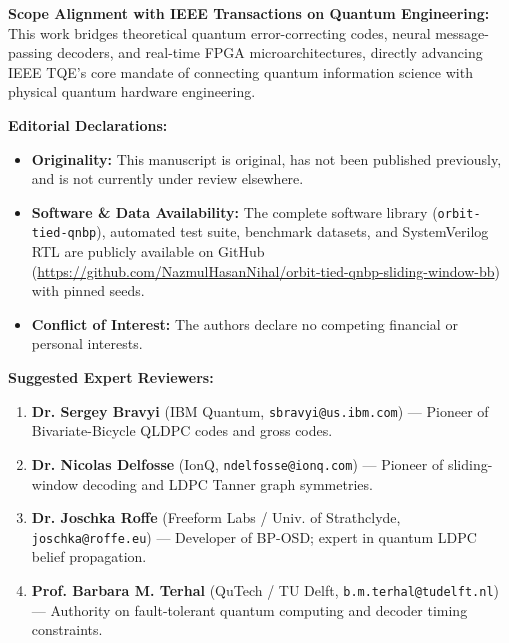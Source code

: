 \documentclass[11pt,a4paper]{article}
\begin{document}
\vspace{0.3cm}

\noindent
\textbf{Scope Alignment with IEEE Transactions on Quantum Engineering:}\\
This work bridges theoretical quantum error-correcting codes, neural message-passing decoders, and real-time FPGA microarchitectures, directly advancing IEEE TQE's core mandate of connecting quantum information science with physical quantum hardware engineering.

\vspace{0.3cm}

\noindent
\textbf{Editorial Declarations:}
\begin{itemize}
    \item \textbf{Originality:} This manuscript is original, has not been published previously, and is not currently under review elsewhere.
    \item \textbf{Software \& Data Availability:} The complete software library (\texttt{orbit-tied-qnbp}), automated test suite, benchmark datasets, and SystemVerilog RTL are publicly available on GitHub (\url{https://github.com/NazmulHasanNihal/orbit-tied-qnbp-sliding-window-bb}) with pinned seeds.
    \item \textbf{Conflict of Interest:} The authors declare no competing financial or personal interests.
\end{itemize}

\vspace{0.3cm}

\noindent
\textbf{Suggested Expert Reviewers:}
\begin{enumerate}
    \item \textbf{Dr. Sergey Bravyi} (IBM Quantum, \texttt{sbravyi@us.ibm.com}) --- Pioneer of Bivariate-Bicycle QLDPC codes and gross codes.
    \item \textbf{Dr. Nicolas Delfosse} (IonQ, \texttt{ndelfosse@ionq.com}) --- Pioneer of sliding-window decoding and LDPC Tanner graph symmetries.
    \item \textbf{Dr. Joschka Roffe} (Freeform Labs / Univ. of Strathclyde, \texttt{joschka@roffe.eu}) --- Developer of BP-OSD; expert in quantum LDPC belief propagation.
    \item \textbf{Prof. Barbara M. Terhal} (QuTech / TU Delft, \texttt{b.m.terhal@tudelft.nl}) --- Authority on fault-tolerant quantum computing and decoder timing constraints.
\end{enumerate}

\vspace{0.5cm}
\end{document}
